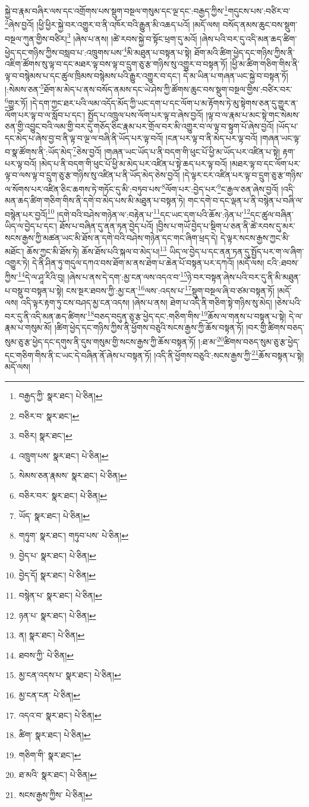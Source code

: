 སྐྱེ་བ་རྣམ་བཞིར་ལས་དང་འགྲོགས་པས་སྡུག་བསྔལ་གསུམ་དང་ལྔ་དང་:བརྒྱད་ཀྱིས་\footnote{བརྒྱད་ཀྱི་  སྣར་ཐང་།  པེ་ཅིན། }གདུངས་པས་:བཙིར་བ་\footnote{བཅིར་བ་  སྣར་ཐང་། }ཞེས་བྱའོ། །ཕྱི་ཕྱིར་སྐྱེ་བར་འགྱུར་བ་ནི་འཁོར་བའི་རྒྱུན་མི་འཆད་པའོ། །མདོ་ལས། བསོད་ནམས་ཆུང་བས་སྡུག་བསྔལ་ཀུན་གྱིས་བཙིར།\footnote{བཅིར།  སྣར་ཐང་། } །ཞེས་པ་ནས། །ཚེ་རབས་སྐྱེ་བ་སྟོང་ཕྲག་དུ་མའོ། །ཞེས་པའི་བར་དུ་འདི་མན་ཆད་ཚིག་ཕྱེད་དང་གཉིས་ཀྱིས་བསླབ་པ་:འཁྲུགས་པས་\footnote{འཁྲུག་པས་  སྣར་ཐང་།  པེ་ཅིན། }མི་མཐུན་པ་བསྟན་པ་སྟེ། ཐོག་མའི་ཚིག་ཕྱེད་དང་གཉིས་ཀྱིས་ནི་འཇིག་ཚོགས་སུ་ལྟ་བ་དང་མཐར་ལྟ་བས་ལྟ་བ་དྲུག་ཅུ་རྩ་གཉིས་སུ་འགྱུར་བ་བསྟན་ཏོ། །ཕྱི་མ་ཚིག་གཅིག་གིས་ནི་ལྟ་བ་བསྙེམས་པ་དང་ཚུལ་ཁྲིམས་བསྙེམས་པའི་རྒྱུར་འགྱུར་བ་དང་། དེ་མ་ཡིན་པ་གཞན་ཡང་སྐྱེ་བ་བསྟན་ཏོ། །:སེམས་ཅན་\footnote{སེམས་ཅན་རྣམས་  སྣར་ཐང་།  པེ་ཅིན། }ཐོག་མ་མེད་པ་ནས་བསོད་ནམས་དང་ཡེ་ཤེས་ཀྱི་ཚོགས་ཆུང་བས་སྡུག་བསྔལ་གྱིས་:བཙིར་བར་\footnote{བཅིར་བར་  སྣར་ཐང་།  པེ་ཅིན། }གྱུར་ཏོ། །དེ་དག་ཀྱང་ཐར་པའི་ལམ་འདོད་མོད་ཀྱི་ཡང་དག་པ་དང་ལོག་པ་མ་རྟོགས་ཏེ་མུ་སྟེགས་ཅན་དུ་གྱུར་ན་ལོག་པར་ལྟ་བ་ལ་སློབ་པ་དང་། སྤྱོད་པ་འཁྲུལ་པས་ལོག་པར་ལྟ་བ་ཞེས་བྱའོ། །ལྟ་བ་ལ་རྣམ་པ་མང་སྟེ་གང་སེམས་ཅན་གྱི་འབྱུང་བའི་ལམ་གྱི་བར་དུ་གཅོད་ཅིང་རྣམ་པར་གྲོལ་བར་མི་འགྱུར་བ་ལ་ལྟ་བ་སྟུག་པོ་ཞེས་བྱའོ། །ཡོད་པ་དང་མེད་པ་ཞེས་བྱ་བ་ནི་ལྟ་བ་ལྔ་ལ་བཞི་ནི་ཡོད་པར་ལྟ་བའོ། །ངན་པར་ལྟ་བ་ནི་མེད་པར་ལྟ་བའོ། །གཞན་ཡང་ལྟ་བ་སྣ་ཚོགས་ནི་:ཡོད་མེད་\footnote{ཡོད་  སྣར་ཐང་།  པེ་ཅིན། }ཅེས་བྱའོ། །གཞན་ཡང་ཡོད་པ་ནི་བདག་གི་ཕུང་པོ་ཕྱི་མ་ཡོད་པར་འཛིན་པ་སྟེ། རྟག་པར་ལྟ་བའོ། །མེད་པ་ནི་བདག་གི་ཕུང་པོ་ཕྱི་མ་མེད་པར་འཛིན་པ་སྟེ་ཆད་པར་ལྟ་བའོ། །མཐར་ལྟ་བ་དང་ལོག་པར་ལྟ་བ་ལས་ལྟ་བ་དྲུག་ཅུ་རྩ་གཉིས་སུ་འཛིན་པ་ནི་ཡོད་མེད་ཅེས་བྱའོ། །དེ་ལྟར་ངར་འཛིན་པར་ལྟ་བ་དྲུག་ཅུ་རྩ་གཉིས་ལ་སོགས་པར་འཛིན་ཅིང་ཆགས་ཏེ་གཏོང་དུ་མི་:བཏུབ་པས་\footnote{གཏུག་  སྣར་ཐང་། གཏུབ་པས་  པེ་ཅིན། }ལོག་པར་:བྱེད་པར་\footnote{བྱེད་པ་  སྣར་ཐང་།  པེ་ཅིན། }ང་རྒྱལ་ཅན་ཞེས་བྱའོ། །འདི་མན་ཆད་ཚིག་གཅིག་གིས་ནི་དགེ་བ་མེད་པས་མི་མཐུན་པ་བསྟན་ཏེ། གང་དགེ་བ་དང་ལྡན་པ་ནི་བསྙེན་པ་བཞི་ལ་བསྙེན་པར་བྱའོ།\footnote{བྱེད་དོ།  སྣར་ཐང་།  པེ་ཅིན། } །དགེ་བའི་བཤེས་གཉེན་ལ་:བརྟེན་པ་\footnote{བསྙེན་པ་  སྣར་ཐང་།  པེ་ཅིན། }དང་ཡང་དག་པའི་ཆོས་:ཉེན་པ་\footnote{ཉན་པ་  སྣར་ཐང་།  པེ་ཅིན། }དང་ཚུལ་བཞིན་ཡིད་ལ་བྱེད་པ་དང་། ཐོས་པ་བཞིན་དུ་ནན་ཏན་བྱེད་པའོ། །བྱིས་པ་གཡོ་བྱེད་པ་སྡིག་པ་ཅན་ནི་ཚེ་རབས་དུ་མར་སངས་རྒྱས་ཀྱི་མཚན་ཡང་མི་ཐོས་ན་དགེ་བའི་བཤེས་གཉེན་དང་གང་ཞིག་ཕྲད་དེ། དེ་ལྟར་སངས་རྒྱས་ཀྱང་མི་མཐོང་། ཆོས་ཀྱང་མི་ཐོས་ཏེ། ཆོས་ཐོས་པའི་སྐལ་བ་མེད་པ།\footnote{ན།  སྣར་ཐང་།  པེ་ཅིན། } ཡིད་ལ་བྱེད་པ་དང་ནན་ཏན་དུ་སྤྱོད་པར་ག་ལ་ཞིག་འགྱུར་ཏེ། དེ་ནི་ཤིན་ཏུ་གདུལ་དཀའ་བས་ཐོག་མ་ནས་ཐེག་པ་ཆེན་པོ་བསྟན་པར་དཀའོ། །མདོ་ལས། ངའི་:ཐབས་ཀྱིས་\footnote{ཐབས་ཀྱི་  པེ་ཅིན། }དེ་ལ་ཤཱ་རིའི་བུ། །ཞེས་པ་ནས་དེ་དག་:མྱ་ངན་ལས་འདའ་བ་\footnote{མྱ་ངན་འདས་པ་  སྣར་ཐང་།  པེ་ཅིན། }ཉེ་བར་བསྟན་ཞེས་པའི་བར་དུ་ནི་མི་མཐུན་པ་བསྡུ་བ་བསྟན་པ་སྟེ། ངས་སྔར་ཐབས་ཀྱི་:མྱ་ངན་\footnote{མྱ་ངན་ངན་  པེ་ཅིན། }ལས་:འདས་པ་\footnote{འདའ་བ་  སྣར་ཐང་།  པེ་ཅིན། }སྡུག་བསྔལ་ཞི་བ་ཙམ་བསྟན་ཏོ། །མདོ་ལས། འདི་ལྟར་རྟག་ཏུ་ངས་བཤད་མྱ་ངན་འདས། །ཞེས་པ་ནས། ཐེག་པ་འདི་ནི་གཅིག་སྟེ་གཉིས་སུ་མེད། །ཅེས་པའི་བར་དུ་ནི་འདི་མན་ཆད་ཚིགས་\footnote{ཚིག་  སྣར་ཐང་།  པེ་ཅིན། }བཅད་བདུན་ཅུ་རྩ་ཕྱེད་དང་:གཅིག་གིས་\footnote{གཅིག་གི་  སྣར་ཐང་། }ཆོས་ལ་གནས་པ་བསྟན་པ་སྟེ། དེ་ལ་རྣམ་པ་གསུམ་མོ། །ཚིག་ཕྱེད་དང་གཉིས་ཀྱིས་ནི་ཕྱོགས་བཅུའི་སངས་རྒྱས་ཀྱི་ཆོས་བསྟན་ཏོ། །བར་གྱི་ཚིགས་བཅད་སུམ་ཅུ་རྩ་ཕྱེད་དང་དགུས་ནི་དུས་གསུམ་གྱི་སངས་རྒྱས་ཀྱི་ཆོས་བསྟན་ཏོ། །:ཐ་མ་\footnote{ཐ་མའི་  སྣར་ཐང་།  པེ་ཅིན། }ཚིགས་བཅད་སུམ་ཅུ་རྩ་ཕྱེད་དང་གཅིག་གིས་ནི་ང་ཡང་དེ་བཞིན་ནོ་ཞེས་པ་བསྟན་ཏོ། །འདི་ནི་ཕྱོགས་བཅུའི་:སངས་རྒྱས་ཀྱི་\footnote{སངས་རྒྱས་ཀྱིས་  པེ་ཅིན། }ཆོས་བསྟན་པ་སྟེ། མདོ་ལས། 